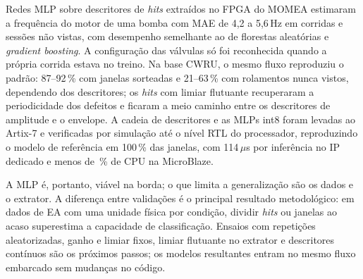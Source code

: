 \documentclass[12pt]{article}
\begin{document}
Redes MLP sobre descritores de \textit{hits} extraídos no FPGA do MOMEA estimaram a frequência do motor de uma bomba com MAE de 4,2 a 5,6\,Hz em corridas e sessões não vistas, com desempenho semelhante ao de florestas aleatórias e \textit{gradient boosting}. A configuração das válvulas só foi reconhecida quando a própria corrida estava no treino. Na base CWRU, o mesmo fluxo reproduziu o padrão: 87--92\,\% com janelas sorteadas e 21--63\,\% com rolamentos nunca vistos, dependendo dos descritores; os \textit{hits} com limiar flutuante recuperaram a periodicidade dos defeitos e ficaram a meio caminho entre os descritores de amplitude e o envelope. A cadeia de descritores e as MLPs int8 foram levadas ao Artix-7 e verificadas por simulação até o nível RTL do processador, reproduzindo o modelo de referência em 100\,\% das janelas, com 114\,\(\mu\)s por inferência no IP dedicado e menos de \mbCargaEnsaioMax\,\% de CPU na MicroBlaze.

A MLP é, portanto, viável na borda; o que limita a generalização são os dados e o extrator. A diferença entre validações é o principal resultado metodológico: em dados de EA com uma unidade física por condição, dividir \textit{hits} ou janelas ao acaso superestima a capacidade de classificação. Ensaios com repetições aleatorizadas, ganho e limiar fixos, limiar flutuante no extrator e descritores contínuos são os próximos passos; os modelos resultantes entram no mesmo fluxo embarcado sem mudanças no código.
\end{document}
